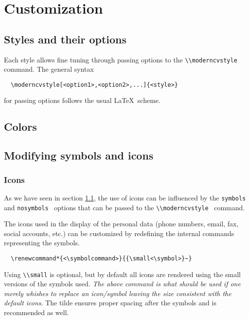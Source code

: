 \documentclass[a4paper,11pt]{article}
\newcommand{\code}[1]{\lstinline!#1!}
\newcommand{\Code}[1]{\lstinline!#1!~} %
\begin{document}
\section{Customization}
\label{section:customization}
\subsection{Styles and their options}
\label{section:customization:stylesAndOptions}
Each style allows fine tuning through passing options to the \Code{\\moderncvstyle} command. The general syntax
\begin{lstlisting}
  \moderncvstyle[<option1>,<option2>,...]{<style>}
\end{lstlisting}
for passing options follows the usual \LaTeX\ scheme.
\label{section:customization:cvstyles}
\subsection{Colors}


\subsection{Modifying symbols and icons}
\subsubsection{Icons}
As we have seen in section \ref{section:customization:stylesAndOptions}, the use of icons can be 
influenced by the \code{symbols} and \Code{nosymbols} options that can be passed to the \Code{\\moderncvstyle} command. \medskip

The icons used in the display of the personal data (phone numbers, email, fax, social accounts, etc.) can be customized by redefining the internal commands representing the symbols.
\begin{lstlisting}
  \renewcommand*{<\symbolcommand>}{{\small<\symbol>}~}
\end{lstlisting} 
Using \code{\\small} is optional, but by default all icons are rendered using the small 
versions of the symbols used. \emph{The above command is what should be used if one merely whishes to 
  replace an icon/symbol leaving the size consistent with the default icons}.
The tilde ensures proper spacing after the symbols and is recommended as well.
\end{document}
